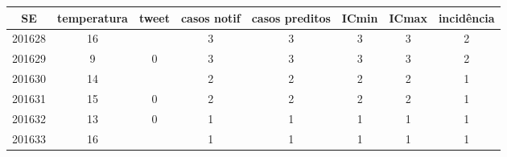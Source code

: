 \begin{tabular}{c|ccccccc}
  \hline
SE & temperatura & tweet & casos notif & casos preditos & ICmin & ICmax & incidência \\ 
  \hline
201628 & 16 &  & 3 & 3 & 3 & 3 & 2 \\ 
  201629 & 9 & 0 & 3 & 3 & 3 & 3 & 2 \\ 
  201630 & 14 &  & 2 & 2 & 2 & 2 & 1 \\ 
  201631 & 15 & 0 & 2 & 2 & 2 & 2 & 1 \\ 
  201632 & 13 & 0 & 1 & 1 & 1 & 1 & 1 \\ 
  201633 & 16 &  & 1 & 1 & 1 & 1 & 1 \\ 
   \hline
\end{tabular}
